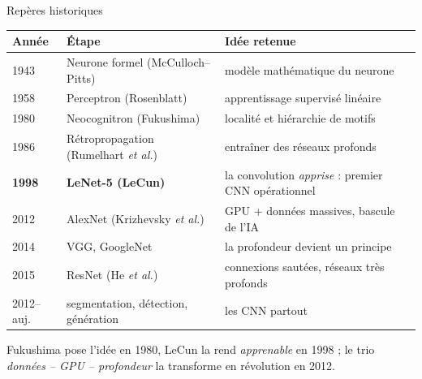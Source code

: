 \begin{frame}{Repères historiques}
\begin{center}
\begin{tabular}{@{}lll@{}}
\toprule
\textbf{Année} & \textbf{Étape} & \textbf{Idée retenue} \\
\midrule
1943 & Neurone formel (McCulloch--Pitts) & modèle mathématique du neurone \\
1958 & Perceptron (Rosenblatt) & apprentissage supervisé linéaire \\
1980 & Neocognitron (Fukushima) & localité et hiérarchie de motifs \\
1986 & Rétropropagation (Rumelhart \emph{et al.}) & entraîner des réseaux profonds \\
\textbf{1998} & \textbf{LeNet-5 (LeCun)} & la convolution \emph{apprise} : premier CNN opérationnel \\
2012 & AlexNet (Krizhevsky \emph{et al.}) & GPU + données massives, bascule de l'IA \\
2014 & VGG, GoogleNet & la profondeur devient un principe \\
2015 & ResNet (He \emph{et al.}) & connexions sautées, réseaux très profonds \\
2012--auj. & segmentation, détection, génération & les CNN partout \\
\bottomrule
\end{tabular}
\end{center}
\vspace{1mm}
\begin{kbox}[À retenir]
Fukushima pose l'idée en 1980, LeCun la rend \emph{apprenable} en 1998 ; le trio
\emph{données -- GPU -- profondeur} la transforme en révolution en 2012.
\end{kbox}
\end{frame}

